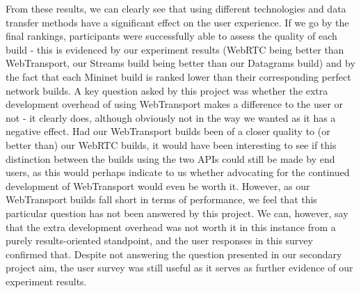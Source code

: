From these results, we can clearly see that using different technologies and data transfer methods have a significant effect on the user experience. If we go by the final rankings, participants were successfully able to assess the quality of each build - this is evidenced by our experiment results (WebRTC being better than WebTransport, our Streams build being better than our Datagrams build) and by the fact that each Mininet build is ranked lower than their corresponding perfect network builds. A key question asked by this project was whether the extra development overhead of using WebTransport makes a difference to the user or not - it clearly does, although obviously not in the way we wanted as it has a negative effect. Had our WebTransport builds been of a closer quality to (or better than) our WebRTC builds, it would have been interesting to see if this distinction between the builds using the two APIs could still be made by end users, as this would perhaps indicate to us whether advocating for the continued development of WebTransport would even be worth it. However, as our WebTransport builds fall short in terms of performance, we feel that this particular question has not been answered by this project. We can, however, say that the extra development overhead was not worth it in this instance from a purely results-oriented standpoint, and the user responses in this survey confirmed that. Despite not answering the question presented in our secondary project aim, the user survey was still useful as it serves as further evidence of our experiment results. 





